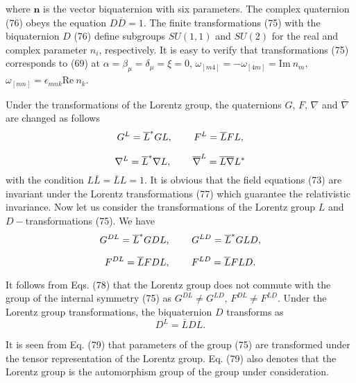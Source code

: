 \documentclass[a4paper,12pt]{article}
\begin{document}
where $\mathbf{n}$ is the vector biquaternion with six parameters.
The complex quaternion (76) obeys the equation $D\overline{D}=1$.
The finite transformations (75) with the biquaternion $D$ (76)
define subgroups $SU(1,1) $ and $SU(2)$ for the real and complex
parameter $n_i$, respectively. It is easy to verify that
transformations (75) corresponds to (69) at $
\alpha=\beta_\mu=\delta_\mu= \xi=0$,
$\omega_{[m4]}=-\omega_{[4m]}=\mbox{Im} ~n_m$,
$\omega_{[mn]}=\epsilon _{mnk}\mbox{Re}~n_k$.

Under the transformations of the Lorentz group, the quaternions
$G$, $F$, $ \nabla $ and $\overline{\nabla }$ are changed as
follows
\[
G^L=\overline{L}^{*}GL,\hspace{0.3in}F^L=\overline{L}FL,
\]
\vspace{-8mm}
\begin{equation}
\label{77}
\end{equation}
\vspace{-8mm}
\[
\nabla ^L=\overline{L}^{*}\nabla L,\hspace{0.3in}\overline{\nabla
}^L= \overline{L}\overline{\nabla }L^{*}
\]
with the condition $L\overline{L}=\overline{L}L=1.$ It is obvious
that the field equations (73) are invariant under the Lorentz
transformations (77) which guarantee the relativistic invariance.
Now let us consider the transformations of the Lorentz group $L$
and $D-$transformations (75). We have
\[
G^{DL}=\overline{L}^{*}GDL,\hspace{0.3in}G^{LD}=\overline{L}^{*}GLD,
\]
\vspace{-8mm}
\begin{equation}
\label{78}
\end{equation}
\vspace{-8mm}
\[
F^{DL}=\overline{L}FDL,\hspace{0.3in}F^{LD}=\overline{L}FLD.
\]

It follows from Eqs. (78) that the Lorentz group does not commute with the
group of the internal symmetry (75) as $G^{DL}\neq G^{LD}$, $F^{DL}\neq
F^{LD}$. Under the Lorentz group transformations, the biquaternion $D$
transforms as
\begin{equation}
D^L=\overline{L}DL.  \label{79}
\end{equation}

It is seen from Eq. (79) that parameters of the group (75) are transformed
under the tensor representation of the Lorentz group. Eq. (79) also denotes
that the Lorentz group is the automorphism group of the group under
consideration.
\end{document}
